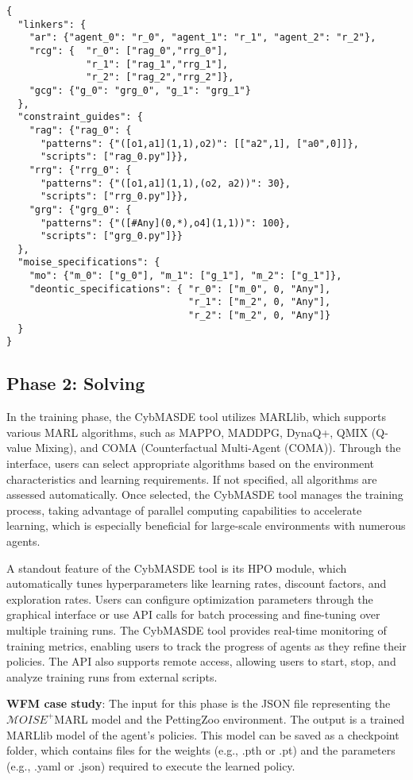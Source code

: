 \documentclass[conference]{IEEEtran}
\begin{document}
{
\footnotesize
\begin{verbatim}
{ 
  "linkers": {
    "ar": {"agent_0": "r_0", "agent_1": "r_1", "agent_2": "r_2"},
    "rcg": {  "r_0": ["rag_0","rrg_0"],
              "r_1": ["rag_1","rrg_1"],
              "r_2": ["rag_2","rrg_2"]},
    "gcg": {"g_0": "grg_0", "g_1": "grg_1"}
  },
  "constraint_guides": {
    "rag": {"rag_0": {
      "patterns": {"([o1,a1](1,1),o2)": [["a2",1], ["a0",0]]},
      "scripts": ["rag_0.py"]}},
    "rrg": {"rrg_0": {
      "patterns": {"([o1,a1](1,1),(o2, a2))": 30},
      "scripts": ["rrg_0.py"]}},
    "grg": {"grg_0": {
      "patterns": {"([#Any](0,*),o4](1,1))": 100},
      "scripts": ["grg_0.py"]}}
  },
  "moise_specifications": {
    "mo": {"m_0": ["g_0"], "m_1": ["g_1"], "m_2": ["g_1"]},
    "deontic_specifications": { "r_0": ["m_0", 0, "Any"],
                                "r_1": ["m_2", 0, "Any"],
                                "r_2": ["m_2", 0, "Any"]}
  }
}
\end{verbatim}
}

\subsection{Phase 2: Solving}

In the training phase, the CybMASDE tool utilizes MARLlib, which supports various MARL algorithms, such as MAPPO, MADDPG, DynaQ+, QMIX (Q-value Mixing), and COMA (Counterfactual Multi-Agent (COMA)). Through the interface, users can select appropriate algorithms based on the environment characteristics and learning requirements. If not specified, all algorithms are assessed automatically. Once selected, the CybMASDE tool manages the training process, taking advantage of parallel computing capabilities to accelerate learning, which is especially beneficial for large-scale environments with numerous agents.

A standout feature of the CybMASDE tool is its HPO module, which automatically tunes hyperparameters like learning rates, discount factors, and exploration rates. Users can configure optimization parameters through the graphical interface or use API calls for batch processing and fine-tuning over multiple training runs. The CybMASDE tool provides real-time monitoring of training metrics, enabling users to track the progress of agents as they refine their policies. The API also supports remote access, allowing users to start, stop, and analyze training runs from external scripts.

\textbf{WFM case study}: The input for this phase is the JSON file representing the $\mathcal{M}OISE^+$MARL model and the PettingZoo environment. The output is a trained MARLlib model of the agent's policies. This model can be saved as a checkpoint folder, which contains files for the weights (e.g., .pth or .pt) and the parameters (e.g., .yaml or .json) required to execute the learned policy.
\end{document}
